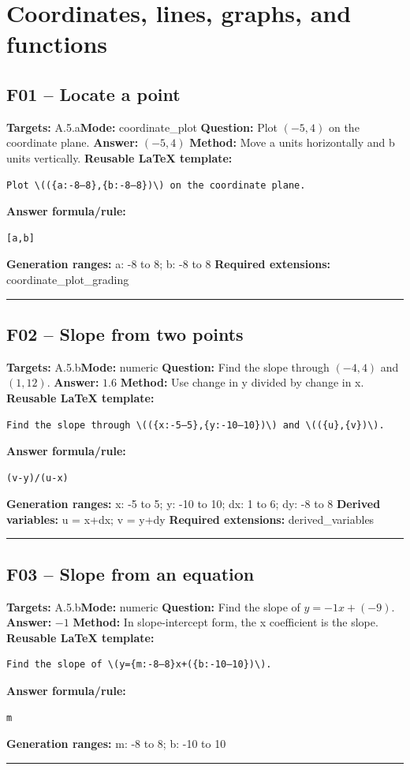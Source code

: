 \documentclass[11pt]{article}
\begin{document}
\section{Coordinates, lines, graphs, and functions}
\subsection{F01 -- Locate a point}
\textbf{Targets:} A.5.a\quad\textbf{Mode:} coordinate\_plot
\textbf{Question:} Plot \((-5,4)\) on the coordinate plane.
\textbf{Answer:} \((-5,4)\)
\textbf{Method:} Move a units horizontally and b units vertically.
\textbf{Reusable LaTeX template:}
\begin{verbatim}
Plot \(({a:-8–8},{b:-8–8})\) on the coordinate plane.
\end{verbatim}
\textbf{Answer formula/rule:}
\begin{verbatim}
[a,b]
\end{verbatim}
\textbf{Generation ranges:} a: -8 to 8; b: -8 to 8
\textbf{Required extensions:} coordinate\_plot\_grading
\medskip\hrule\medskip
\subsection{F02 -- Slope from two points}
\textbf{Targets:} A.5.b\quad\textbf{Mode:} numeric
\textbf{Question:} Find the slope through \((-4,4)\) and \((1,12)\).
\textbf{Answer:} \(1.6\)
\textbf{Method:} Use change in y divided by change in x.
\textbf{Reusable LaTeX template:}
\begin{verbatim}
Find the slope through \(({x:-5–5},{y:-10–10})\) and \(({u},{v})\).
\end{verbatim}
\textbf{Answer formula/rule:}
\begin{verbatim}
(v-y)/(u-x)
\end{verbatim}
\textbf{Generation ranges:} x: -5 to 5; y: -10 to 10; dx: 1 to 6; dy: -8 to 8
\textbf{Derived variables:} u = x+dx; v = y+dy
\textbf{Required extensions:} derived\_variables
\medskip\hrule\medskip
\subsection{F03 -- Slope from an equation}
\textbf{Targets:} A.5.b\quad\textbf{Mode:} numeric
\textbf{Question:} Find the slope of \(y=-1x+(-9)\).
\textbf{Answer:} \(-1\)
\textbf{Method:} In slope-intercept form, the x coefficient is the slope.
\textbf{Reusable LaTeX template:}
\begin{verbatim}
Find the slope of \(y={m:-8–8}x+({b:-10–10})\).
\end{verbatim}
\textbf{Answer formula/rule:}
\begin{verbatim}
m
\end{verbatim}
\textbf{Generation ranges:} m: -8 to 8; b: -10 to 10
\medskip\hrule\medskip
\end{document}

